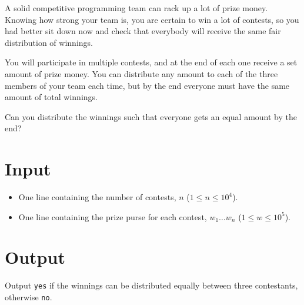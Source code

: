 
A solid competitive programming team can rack up a lot of prize money. Knowing
how strong your team is, you are certain to win a lot of contests, so you had
better sit down now and check that everybody will receive the same fair
distribution of winnings.

You will participate in multiple contests, and at the end of each one receive
a set amount of prize money. You can distribute any amount to each of the three
members of your team each time, but by the end everyone must have the same
amount of total winnings.

Can you distribute the winnings such that everyone gets an equal amount by the
end?

\section*{Input}

\begin{itemize}
  \item One line containing the number of contests,
        $n$ ($1 \le n \le 10^4$).
  \item One line containing the prize purse for each contest,
        $w_1 \ldots w_n$ ($1 \le w \le 10^5$).
\end{itemize}

\section*{Output}

Output \texttt{yes} if the winnings can be distributed equally between three
contestants, otherwise \texttt{no}.
